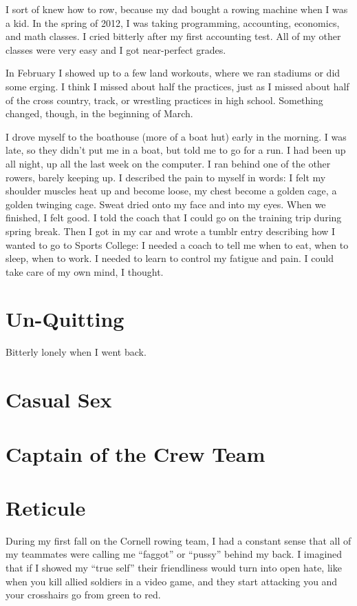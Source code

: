 \documentclass[12pt]{article}
\begin{document}
I sort of knew how to row, because my dad bought a rowing machine when I was a
kid.  In the spring of 2012, I was taking programming, accounting, economics, and
math classes.  I cried bitterly after my first accounting test.  All of my
other classes were very easy and I got near-perfect grades.

In February I showed up to a few land workouts, where we ran stadiums or did
some erging.  I think I missed about half the practices, just as I missed about
half of the cross country, track, or wrestling practices in high school.
Something changed, though, in the beginning of March.

I drove myself to the boathouse (more of a boat hut) early in the morning.  I
was late, so they didn't put me in a boat, but told me to go for a run.  I had
been up all night, up all the last week on the computer.  I ran behind one of
the other rowers, barely keeping up.  I described the pain to myself in words: I
felt my shoulder muscles heat up and become loose, my chest become a golden
cage, a golden twinging cage.  Sweat dried onto my face and into my eyes.  When
we finished, I felt good.  I told the coach that I could go on the training trip
during spring break.  Then I got in my car and wrote a tumblr entry describing
how I wanted to go to Sports College: I needed a coach to tell me when to eat,
when to sleep, when to work.  I needed to learn to control my fatigue and pain.
I could take care of my own mind, I thought.


\section{Un-Quitting}
Bitterly lonely when I went back.

\section{Casual Sex}

\section{Captain of the Crew Team}

\section{Reticule}
During my first fall on the Cornell rowing team, I had a constant sense that
all of my teammates were calling me ``faggot'' or ``pussy'' behind my back.  I
imagined that if I showed my ``true self'' their friendliness would turn into
open hate, like when you kill allied soldiers in a video game, and they start
attacking you and your crosshairs go from green to red.  
\end{document}
